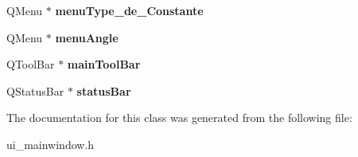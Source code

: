 \begin{DoxyCompactItemize}
\item 
\hypertarget{class_ui___main_window_a24c329f45c723c83d4fddebf105b3fc6}{Q\-Menu $\ast$ {\bfseries menu\-Type\-\_\-de\-\_\-\-Constante}}\label{class_ui___main_window_a24c329f45c723c83d4fddebf105b3fc6}

\item 
\hypertarget{class_ui___main_window_a345a4ec92e6309977909efe6600b45c1}{Q\-Menu $\ast$ {\bfseries menu\-Angle}}\label{class_ui___main_window_a345a4ec92e6309977909efe6600b45c1}

\item 
\hypertarget{class_ui___main_window_a5172877001c8c7b4e0f6de50421867d1}{Q\-Tool\-Bar $\ast$ {\bfseries main\-Tool\-Bar}}\label{class_ui___main_window_a5172877001c8c7b4e0f6de50421867d1}

\item 
\hypertarget{class_ui___main_window_a50fa481337604bcc8bf68de18ab16ecd}{Q\-Status\-Bar $\ast$ {\bfseries status\-Bar}}\label{class_ui___main_window_a50fa481337604bcc8bf68de18ab16ecd}

\end{DoxyCompactItemize}


The documentation for this class was generated from the following file\-:\begin{DoxyCompactItemize}
\item 
ui\-\_\-mainwindow.\-h\end{DoxyCompactItemize}
